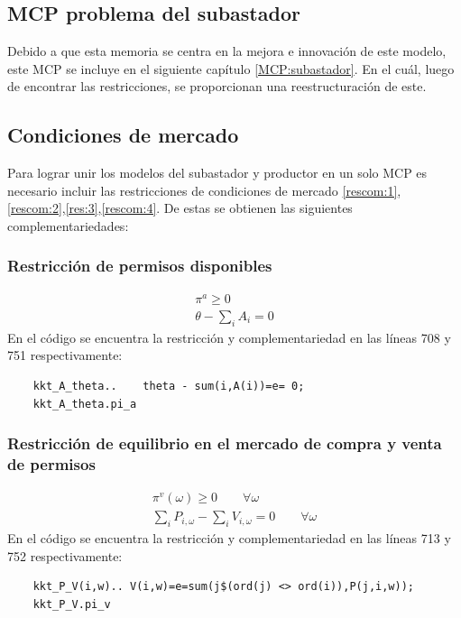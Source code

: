 \subsection{MCP problema del subastador}

Debido a que esta memoria se centra en la mejora e innovación de este modelo, este MCP se incluye en el siguiente capítulo \ref{MCP:subastador}. En el cuál, luego de encontrar las restricciones, se proporcionan una reestructuración de este. 

\subsection{Condiciones de mercado}
Para lograr unir los modelos del subastador y productor en un solo MCP es necesario incluir las restricciones de condiciones de mercado \ref{rescom:1}, \ref{rescom:2},\ref{res:3},\ref{rescom:4}. De estas se obtienen las siguientes complementariedades:

\subsubsection{Restricción de permisos disponibles}
\footnotesize{
\begin{align}
 \pi^a \geq 0 \\
 \theta - \sum_{i}A_i = 0  
\end{align}}
En el código se encuentra la restricción y complementariedad en las líneas 708 y 751 respectivamente: 
\begin{verbatim}
    kkt_A_theta..    theta - sum(i,A(i))=e= 0;
    kkt_A_theta.pi_a
\end{verbatim}

\subsubsection{Restricción de equilibrio en el mercado de compra y venta de permisos}
\footnotesize{
\begin{align}
 \pi^v(\omega) \geq 0 \qquad \forall \omega\\
 \sum_{i}P_{i,\omega} - \sum_{i}V_{i,\omega} = 0 \qquad \forall \omega  
\end{align}}
En el código se encuentra la restricción y complementariedad en las líneas 713 y 752 respectivamente: 
\begin{verbatim}
    kkt_P_V(i,w).. V(i,w)=e=sum(j$(ord(j) <> ord(i)),P(j,i,w));
    kkt_P_V.pi_v 
\end{verbatim}

